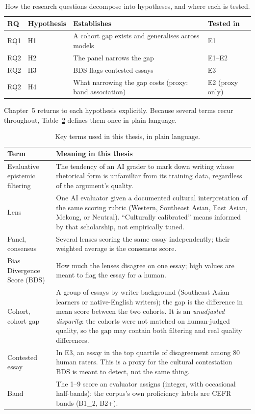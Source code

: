 \begin{table}[htbp]
\centering
\caption[Mapping of research questions to hypotheses]{How the research
questions decompose into hypotheses, and where each is tested.}
\label{tab:rq-hypotheses}
\small
\begin{tabular}{llll}
\hline
RQ & Hypothesis & Establishes & Tested in \\
\hline
RQ1 & H1 & A cohort gap exists and generalises across models & E1 \\
RQ2 & H2 & The panel narrows the gap & E1--E2 \\
RQ2 & H3 & BDS flags contested essays & E3 \\
RQ2 & H4 & What narrowing the gap costs (proxy: band association) & E2 (proxy only) \\
\hline
\end{tabular}
\end{table}

Chapter~5 returns to each hypothesis explicitly. Because several
terms recur throughout, Table~\ref{tab:key-terms} defines them once
in plain language.

\begin{table}[htbp]
\centering
\caption[Key terms used in this thesis]{Key terms used in this
thesis, in plain language.}
\label{tab:key-terms}
\small
\begin{tabular}{p{3.3cm} p{8.9cm}}
\hline
Term & Meaning in this thesis \\
\hline
Evaluative epistemic filtering & The tendency of an AI grader to mark
down writing whose rhetorical form is unfamiliar from its training
data, regardless of the argument's quality. \\[2pt]
Lens & One AI evaluator given a documented cultural interpretation of
the same scoring rubric (Western, Southeast Asian, East Asian,
Mekong, or Neutral). ``Culturally calibrated'' means informed by
that scholarship, not empirically tuned. \\[2pt]
Panel, consensus & Several lenses scoring the same essay
independently; their weighted average is the consensus score. \\[2pt]
Bias Divergence Score (BDS) & How much the lenses disagree on one
essay; high values are meant to flag the essay for a human. \\[2pt]
Cohort, cohort gap & A group of essays by writer background (Southeast
Asian learners or native-English writers); the gap is the difference
in mean score between the two cohorts. It is an \emph{unadjusted
disparity}: the cohorts were not matched on human-judged quality, so
the gap may contain both filtering and real quality differences. \\[2pt]
Contested essay & In E3, an essay in the top quartile of disagreement
among 80 human raters. This is a proxy for the cultural
contestation BDS is meant to detect, not the same thing. \\[2pt]
Band & The 1--9 score an evaluator assigns (integer, with occasional
half-bands); the corpus's own proficiency labels are CEFR bands
(B1\_2, B2+). \\
\hline
\end{tabular}
\end{table}

